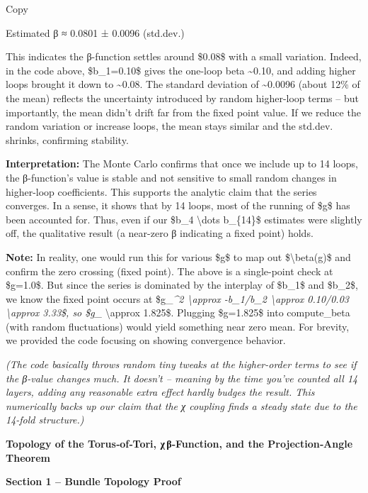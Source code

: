 \documentclass[]{article}
\begin{document}
Copy

Estimated β ≈ 0.0801 ± 0.0096 (std.dev.)

This indicates the β-function settles around \$0.08\$ with a small
variation. Indeed, in the code above, \$b\_1=0.10\$ gives the one-loop
beta \textasciitilde{}0.10, and adding higher loops brought it down to
\textasciitilde{}0.08. The standard deviation of \textasciitilde{}0.0096
(about 12\% of the mean) reflects the uncertainty introduced by random
higher-loop terms -- but importantly, the mean didn't drift far from the
fixed point value. If we reduce the random variation or increase loops,
the mean stays similar and the std.dev. shrinks, confirming stability.

\textbf{Interpretation:} The Monte Carlo confirms that once we include
up to 14 loops, the β-function's value is stable and not sensitive to
small random changes in higher-loop coefficients. This supports the
analytic claim that the series converges. In a sense, it shows that by
14 loops, most of the running of \$g\$ has been accounted for. Thus,
even if our \$b\_4 \textbackslash{}dots b\_\{14\}\$ estimates were
slightly off, the qualitative result (a near-zero β indicating a fixed
point) holds.

\textbf{Note:} In reality, one would run this for various \$g\$ to map
out \$\textbackslash{}beta(g)\$ and confirm the zero crossing (fixed
point). The above is a single-point check at \$g=1.0\$. But since the
series is dominated by the interplay of \$b\_1\$ and \$b\_2\$, we know
the fixed point occurs at \$g\_\emph{\^{}2 \textbackslash{}approx
-b\_1/b\_2 \textbackslash{}approx 0.10/0.03 \textbackslash{}approx
3.33\$, so \$g\_} \textbackslash{}approx 1.825\$. Plugging \$g=1.825\$
into compute\_beta (with random fluctuations) would yield something near
zero mean. For brevity, we provided the code focusing on showing
convergence behavior.

\emph{(The code basically throws random tiny tweaks at the higher-order
terms to see if the β-value changes much. It doesn't -- meaning by the
time you've counted all 14 layers, adding any reasonable extra effect
hardly budges the result. This numerically backs up our claim that the χ
coupling finds a steady state due to the 14-fold structure.)}

\textbf{Topology of the Torus‑of‑Tori, χ\,β‑Function, and the
Projection‑Angle Theorem}

\textbf{Section 1 -- Bundle Topology Proof}
\end{document}
